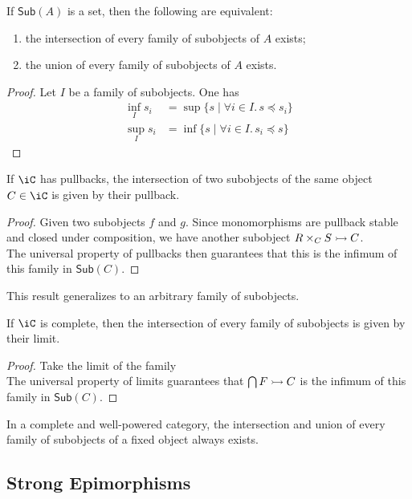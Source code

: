 \documentclass{amsart}
\begin{document}
\begin{prop}
  If $\mathsf{Sub}(A)$ is a set, then the following are equivalent:
  \begin{enumerate}
  \item the intersection of every family of subobjects of $A$ exists;
  \item the union of every family of subobjects of $A$ exists.
  \end{enumerate}
\end{prop}
\begin{proof}
  Let $I$ be a family of subobjects.
  One has
  \begin{align}
    \inf_{I}s_{i} &= \sup\{s \mid \forall i \in I.\,s \preceq s_{i}\}\\
    \sup_{I}s_{i} &= \inf\{s \mid \forall i \in I.\,s_{i} \preceq s\}
  \end{align}
\end{proof}

\begin{prop}
  If $\iC$ has pullbacks, the intersection of two subobjects of the same object $C \in \iC$ is given by their pullback.
\end{prop}
\begin{proof}
  Given two subobjects $f$ and $g$.
  Since monomorphisms are pullback stable and closed under composition, we have another subobject $R \times_{C} S \rightarrowtail C$.
  \[\]
  The universal property of pullbacks then guarantees that this is the infimum of this family in $\mathsf{Sub}(C)$.
\end{proof}

This result generalizes to an arbitrary family of subobjects.
\begin{prop}
  If $\iC$ is complete, then the intersection of every family of subobjects is given by their limit.
\end{prop}
\begin{proof}
  Take the limit of the family
  \[\]
  The universal property of limits guarantees that $\bigcap F \rightarrowtail C$ is the infimum of this family in $\mathsf{Sub}(C)$.
\end{proof}

\begin{cor}
  In a complete and well-powered category, the intersection and union of every family of subobjects of a fixed object always exists.
\end{cor}

\subsection{Strong Epimorphisms}
\label{sec:strong-epimorphisms}
\end{document}
